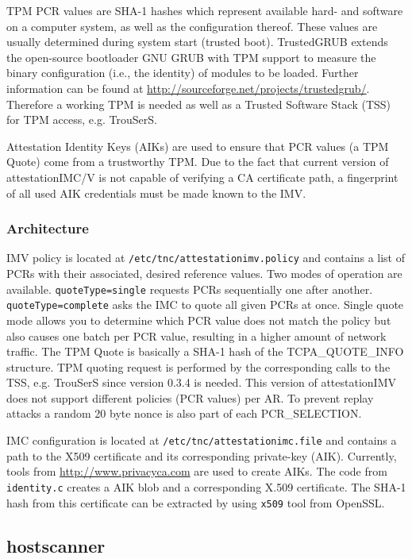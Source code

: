 \documentclass[a4paper,10pt]{scrartcl}
\newcommand{\code}[1]{{\tt{#1}}}
\begin{document}
TPM PCR values are SHA-1 hashes which represent available hard- and software on a computer system, as well as the configuration thereof. These values are usually determined during system start (trusted boot).
TrustedGRUB extends the open-source bootloader GNU GRUB with TPM support
to measure the binary configuration (i.e., the identity) of modules to be loaded.
Further information can be found at \url{http://sourceforge.net/projects/trustedgrub/}.
Therefore a working TPM is needed as well as a Trusted Software Stack (TSS) for TPM access, e.g. TrouSerS.

Attestation Identity Keys (AIKs) are used to ensure that PCR values (a TPM Quote) come from a trustworthy TPM.
Due to the fact that current version of attestationIMC/V is not capable of verifying a CA certificate path, a fingerprint of all used AIK credentials must be made known to the IMV.

\subsubsection{Architecture}

IMV policy is located at \code{/etc/tnc/attestationimv.policy} and contains
a list of PCRs with their associated, desired reference values.
Two modes of operation are available. \code{quoteType=single} requests PCRs sequentially one after another.
\code{quoteType=complete} asks the IMC to quote all given PCRs at once.
Single quote mode allows you to determine which PCR value does not match the policy but also causes 
one batch per PCR value, resulting in a higher amount of network traffic.
The TPM Quote is basically a SHA-1 hash of the TCPA\_QUOTE\_INFO structure.
TPM quoting request is performed by the corresponding calls to the TSS,
e.g. TrouSerS since version 0.3.4 is needed.
This version of attestationIMV does not support different policies (PCR values) per AR.
To prevent replay attacks a random 20 byte nonce is also part of each PCR\_SELECTION.

IMC configuration is located at \code{/etc/tnc/attestationimc.file} and contains a path to the 
X509 certificate and its corresponding private-key (AIK).
Currently, tools from \url{http://www.privacyca.com} are used
to create AIKs. The code from \code{identity.c} creates a AIK
blob and a corresponding X.509 certificate.
The SHA-1 hash from this certificate can be extracted by using
 \code{x509} tool from OpenSSL.

\subsection{hostscanner}
\end{document}
